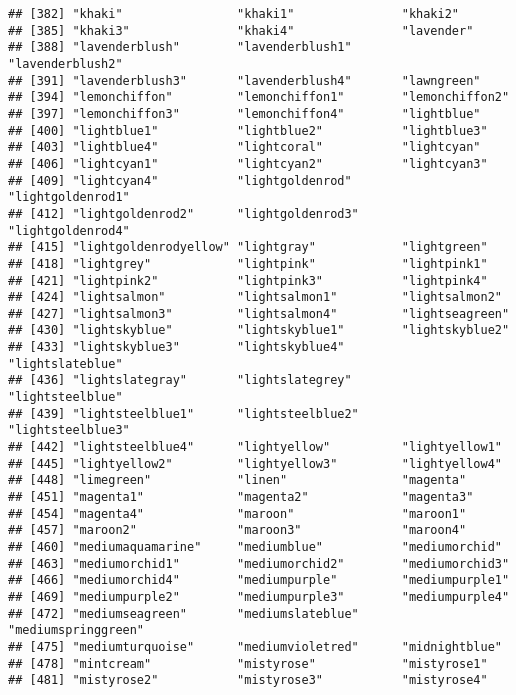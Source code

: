 \documentclass[
]{article}
\begin{document}
\begin{verbatim}
## [382] "khaki"                "khaki1"               "khaki2"              
## [385] "khaki3"               "khaki4"               "lavender"            
## [388] "lavenderblush"        "lavenderblush1"       "lavenderblush2"      
## [391] "lavenderblush3"       "lavenderblush4"       "lawngreen"           
## [394] "lemonchiffon"         "lemonchiffon1"        "lemonchiffon2"       
## [397] "lemonchiffon3"        "lemonchiffon4"        "lightblue"           
## [400] "lightblue1"           "lightblue2"           "lightblue3"          
## [403] "lightblue4"           "lightcoral"           "lightcyan"           
## [406] "lightcyan1"           "lightcyan2"           "lightcyan3"          
## [409] "lightcyan4"           "lightgoldenrod"       "lightgoldenrod1"     
## [412] "lightgoldenrod2"      "lightgoldenrod3"      "lightgoldenrod4"     
## [415] "lightgoldenrodyellow" "lightgray"            "lightgreen"          
## [418] "lightgrey"            "lightpink"            "lightpink1"          
## [421] "lightpink2"           "lightpink3"           "lightpink4"          
## [424] "lightsalmon"          "lightsalmon1"         "lightsalmon2"        
## [427] "lightsalmon3"         "lightsalmon4"         "lightseagreen"       
## [430] "lightskyblue"         "lightskyblue1"        "lightskyblue2"       
## [433] "lightskyblue3"        "lightskyblue4"        "lightslateblue"      
## [436] "lightslategray"       "lightslategrey"       "lightsteelblue"      
## [439] "lightsteelblue1"      "lightsteelblue2"      "lightsteelblue3"     
## [442] "lightsteelblue4"      "lightyellow"          "lightyellow1"        
## [445] "lightyellow2"         "lightyellow3"         "lightyellow4"        
## [448] "limegreen"            "linen"                "magenta"             
## [451] "magenta1"             "magenta2"             "magenta3"            
## [454] "magenta4"             "maroon"               "maroon1"             
## [457] "maroon2"              "maroon3"              "maroon4"             
## [460] "mediumaquamarine"     "mediumblue"           "mediumorchid"        
## [463] "mediumorchid1"        "mediumorchid2"        "mediumorchid3"       
## [466] "mediumorchid4"        "mediumpurple"         "mediumpurple1"       
## [469] "mediumpurple2"        "mediumpurple3"        "mediumpurple4"       
## [472] "mediumseagreen"       "mediumslateblue"      "mediumspringgreen"   
## [475] "mediumturquoise"      "mediumvioletred"      "midnightblue"        
## [478] "mintcream"            "mistyrose"            "mistyrose1"          
## [481] "mistyrose2"           "mistyrose3"           "mistyrose4"          

\end{verbatim}
\end{document}
